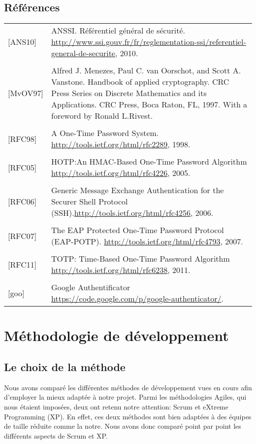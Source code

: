\documentclass{../../res/univ-projet}
\begin{document}
\subsection{Références} 
	\begin{tabular}{p{}>{\raggedright\arraybackslash}p{13cm}}
		{[ANS10]} & {ANSSI. Référentiel général de sécurité. \href{http://www.ssi.gouv.fr/fr/reglementation-ssi/referentiel-general-de-securite}{http://www.ssi.gouv.fr/fr/reglementation-ssi/referentiel-general-de-securite}, 2010.}
		\tabularnewline
		\\
		{[MvOV97]} & {Alfred J. Menezes, Paul C. van Oorschot, and Scott A. Vanstone. Handbook of applied cryptography. CRC Press Series on Discrete Mathematics and its Applications. CRC Press, Boca Raton, FL, 1997. With a foreword by Ronald L.Rivest.}
		\tabularnewline
		\\
		{[RFC98]} & {A One-Time Password System. \href{http://tools.ietf.org/html/rfc2289}{http://tools.ietf.org/html/rfc2289}, 1998.}
		\tabularnewline
		\\
		{[RFC05]} & {HOTP:An HMAC-Based One-Time Password Algorithm \href{http://tools.ietf.org/html/rfc4226}{http://tools.ietf.org/html/rfc4226}, 2005.}
		\tabularnewline
		\\
		{[RFC06]} & {Generic Message Exchange Authentication for the Securer Shell Protocol (SSH).\href{http://tools.ietf.org/html/rfc4256}{http://tools.ietf.org/html/rfc4256}, 2006.}
		\tabularnewline
		\\
		{[RFC07]} & {The EAP Protected One-Time Password Protocol (EAP-POTP). \href{http://tools.ietf.org/html/rfc4793}{http://tools.ietf.org/html/rfc4793}, 2007.}
		\tabularnewline
		\\
		{[RFC11]} & {TOTP: Time-Based One-Time Password Algorithm \href{http://tools.ietf.org/html/rfc6238}{http://tools.ietf.org/html/rfc6238}, 2011.}
		\tabularnewline
		\\
		{[goo]} & {Google Authentificator \href{https://code.google.com/p/google-authenticator/}{https://code.google.com/p/google-authenticator/}.}
	\end{tabular}
	
\newpage
\section{Méthodologie de développement}
\subsection{Le choix de la méthode}
	Nous avons comparé les différentes méthodes de développement vues en cours afin d'employer la mieux adaptée à notre projet. Parmi les méthodologies Agiles, qui nous étaient imposées, deux ont retenu notre attention: Scrum et eXtreme Programming (XP). En effet, ces deux méthodes sont bien adaptées à des équipes de taille réduite comme la notre. Nous avons donc comparé point par point les différents aspects de Scrum et XP.\\
\end{document}
